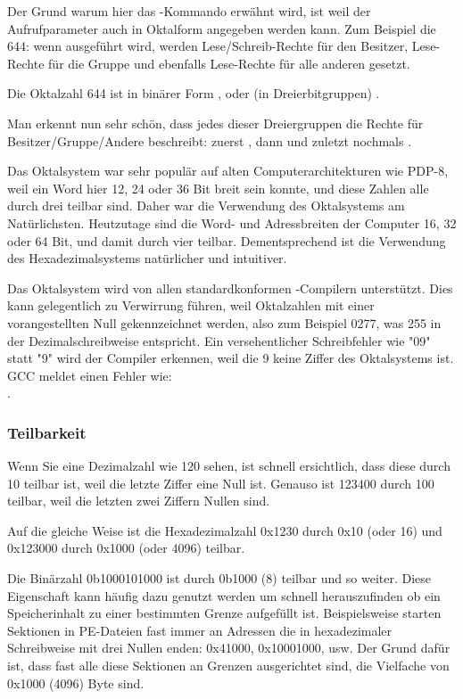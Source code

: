 Der Grund warum hier das -Kommando erwähnt wird, ist weil der Aufrufparameter auch in Oktalform angegeben werden kann.
Zum Beispiel die 644: wenn  ausgeführt wird, werden Lese/Schreib-Rechte für den Besitzer, Lese-Rechte für
die Gruppe und ebenfalls Lese-Rechte für alle anderen gesetzt.

Die Oktalzahl 644 ist in binärer Form , oder (in Dreierbitgruppen) .

Man erkennt nun sehr schön, dass jedes dieser Dreiergruppen die Rechte für Besitzer/Gruppe/Andere beschreibt:
zuerst  , dann  und zuletzt nochmals .

Das Oktalsystem war sehr populär auf alten Computerarchitekturen wie PDP-8, weil ein Word hier 12, 24 oder 36 Bit breit sein konnte,
und diese Zahlen alle durch drei teilbar sind. Daher war die Verwendung des Oktalsystems am Natürlichsten.
Heutzutage sind die Word- und Adressbreiten der Computer 16, 32 oder 64 Bit, und damit durch vier teilbar. Dementsprechend ist die
Verwendung des Hexadezimalsystems natürlicher und intuitiver.

Das Oktalsystem wird von allen standardkonformen \CCpp-Compilern unterstützt.
Dies kann gelegentlich zu Verwirrung führen, weil Oktalzahlen mit einer vorangestellten Null gekennzeichnet werden,
also zum Beispiel 0277, was 255 in der Dezimalschreibweise entspricht.
Ein versehentlicher Schreibfehler wie "09" statt "9" wird der Compiler erkennen, weil die 9 keine Ziffer des Oktalsystems ist.
GCC meldet einen Fehler wie:\\
.

\subsubsection{Teilbarkeit}

Wenn Sie eine Dezimalzahl wie 120 sehen, ist schnell ersichtlich, dass diese durch 10 teilbar ist, weil die letzte Ziffer eine Null ist.
Genauso ist 123400 durch 100 teilbar, weil die letzten zwei Ziffern Nullen sind.

Auf die gleiche Weise ist die Hexadezimalzahl 0x1230 durch 0x10 (oder 16) und 0x123000 durch 0x1000 (oder 4096) teilbar.

Die Binärzahl 0b1000101000 ist durch 0b1000 (8) teilbar und so weiter.
Diese Eigenschaft kann häufig dazu genutzt werden um schnell herauszufinden ob ein Speicherinhalt zu einer bestimmten Grenze
aufgefüllt ist. Beispielsweise starten Sektionen in \ac{PE}-Dateien fast immer an Adressen die in hexadezimaler Schreibweise
mit drei Nullen enden: 0x41000, 0x10001000, usw.
Der Grund dafür ist, dass fast alle diese Sektionen an Grenzen ausgerichtet sind, die Vielfache von 0x1000 (4096) Byte sind.

